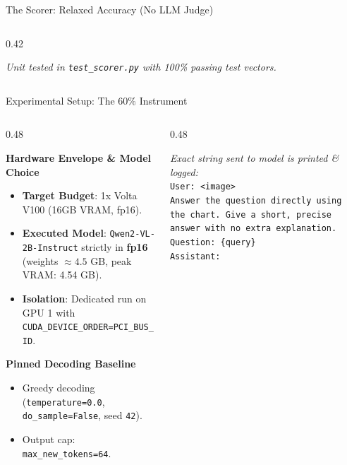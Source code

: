 \documentclass[aspectratio=169, 10pt]{beamer}
\begin{document}
\begin{frame}{The Scorer: Relaxed Accuracy (No LLM Judge)}
\begin{columns}[T]
\begin{column}{0.42\textwidth}
\begin{tcolorbox}[title=\textbf{Scorer Behavior Examples}]
                \footnotesize
                \textit{Unit tested in \texttt{test\_scorer.py} with 100\% passing test vectors.}
            \end{tcolorbox}
        \end{column}
    \end{columns}
\end{frame}

\begin{frame}{Experimental Setup: The 60\% Instrument}
    \begin{columns}[T]
        \begin{column}{0.48\textwidth}
            \begin{block}{\textbf{Hardware Envelope \& Model Choice}}
                \begin{itemize}
                    \item \textbf{Target Budget}: 1x Volta V100 (16GB VRAM, fp16).
                    \item \textbf{Executed Model}: \texttt{Qwen2-VL-2B-Instruct} strictly in \textbf{fp16} (weights $\approx 4.5$ GB, peak VRAM: 4.54 GB).
                    \item \textbf{Isolation}: Dedicated run on GPU 1 with \texttt{CUDA\_DEVICE\_ORDER=PCI\_BUS\_ID}.
                \end{itemize}
            \end{block}
            
            \begin{block}{\textbf{Pinned Decoding Baseline}}
                \begin{itemize}
                    \item Greedy decoding (\texttt{temperature=0.0}, \texttt{do\_sample=False}, seed \texttt{42}).
                    \item Output cap: \texttt{max\_new\_tokens=64}.
                \end{itemize}
            \end{block}
        \end{column}

        \begin{column}{0.48\textwidth}
            \begin{tcolorbox}[colframe=primary, title=\textbf{Documented Prompt Path}]
                \small
                \textit{Exact string sent to model is printed \& logged:}\\
                \texttt{User: <image>\\
                Answer the question directly using the chart. Give a short, precise answer with no extra explanation. Question: \{query\}\\
                Assistant:}
            \end{tcolorbox}


\end{column}
\end{columns}
\end{frame}
\end{document}
